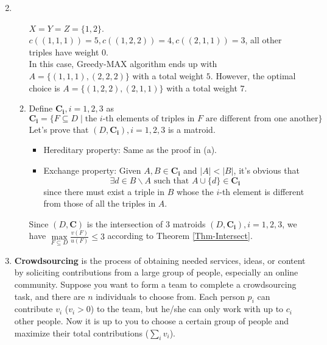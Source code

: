 \documentclass[12pt,a4paper]{article}
\makeatletter
\newtheorem*{solution}{Solution}
\theoremstyle{definition}
\renewenvironment{solution}[1][Solution] {\par\pushQED{\qed}\normalfont\topsep6\p@\@plus6\p@\relax\trivlist\item[\hskip\labelsep\bfseries#1\@addpunct{.}]\ignorespaces}{\popQED\endtrivlist\@endpefalse} \makeatother
\makeatother
\begin{document}
\begin{enumerate}
\begin{solution}
\begin{enumerate}[label = (\alph*)]
 			$X = Y = Z = \{1, 2\}$. $c((1, 1, 1)) = 5, c((1, 2, 2)) = 4, c((2, 1, 1)) = 3$, all other triples have weight $0$. \\
 			In this case, Greedy-MAX algorithm ends up with $A = \{(1, 1, 1), (2, 2, 2)\}$ with a total weight $5$. However, the optimal choice is $A = \{(1, 2, 2), (2, 1, 1)\}$ with a total weight $7$.
 			\item
 			Define $\mathbf{C_i}, i=1,2,3$ as
 			\[\mathbf{C_i} = \{F \subseteq D \mid \text{the } i \text{-th elements of  triples in } F \text{ are different from one another}\}\]
 			Let's prove that $(D, \mathbf{C_i}), i=1,2,3$ is a matroid. 
 			\begin{itemize}
 				\item 
 				Hereditary property: Same as the proof in (a).
 				\item 
 				Exchange property: Given $A, B \in \mathbf{C_i}$ and $| A | < | B |$, it's obvious that 
 				\[\exists d \in B \backslash A \text{ such that } A \cup \{d\} \in \mathbf{C_i}\]
 				since there must exist a triple in $B$ whose the $i$-th element is different from those of all the triples in $A$.
 			\end{itemize}
 			Since $(D, \mathbf{C})$ is the intersection of $3$ matroids $(D, \mathbf{C_i}), i=1,2,3$, we have $\max\limits_{F \subseteq D} \frac{v(F)}{u(F)} \leq 3$ according to Theorem \ref{Thm-Intersect}.
 		\end{enumerate}
 	\end{solution}



	\item
	\textbf{Crowdsourcing} is the process of obtaining needed services, ideas, or content by soliciting contributions from a large group of people, especially an online community. Suppose you want to form a team to complete a crowdsourcing task, and there are $n$ individuals to choose from. Each person $p_i$ can contribute $v_i$ ($v_i > 0$) to the team, but he/she can only work with up to $c_i$ other people. Now it is up to you to choose a certain group of people and maximize their total contributions ($\sum_i{v_i}$).
	

\end{enumerate}
\end{document}
